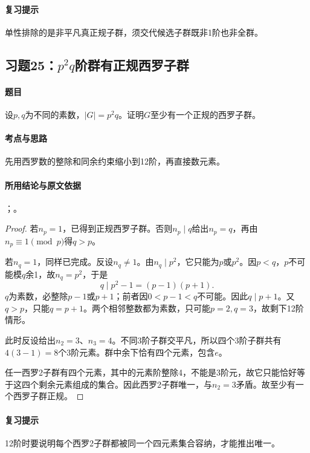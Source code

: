 \paragraph{复习提示}
单性排除的是非平凡真正规子群，须交代候选子群既非1阶也非全群。


\subsection{习题25：\texorpdfstring{$p^2q$阶群有正规西罗子群}{p2q阶群有正规西罗子群}}
\label{ex:2:25}

\paragraph{题目}
设$p,q$为不同的素数，$|G|=p^2q$。证明$G$至少有一个正规的西罗子群。

\paragraph{考点与思路}
先用西罗数的整除和同余约束缩小到12阶，再直接数元素。

\paragraph{所用结论与原文依据}
；。


\begin{proof}
若$n_p=1$，已得到正规西罗子群。否则$n_p\mid q$给出$n_p=q$，再由$n_p\equiv1\pmod p$得$q>p$。

若$n_q=1$，同样已完成。反设$n_q\ne1$。由$n_q\mid p^2$，它只能为$p$或$p^2$。因$p<q$，$p$不可能模$q$余1，故$n_q=p^2$，于是
\[
q\mid p^2-1=(p-1)(p+1).
\]
$q$为素数，必整除$p-1$或$p+1$；前者因$0<p-1<q$不可能。因此$q\mid p+1$。又$q>p$，只能$q=p+1$。两个相邻整数都为素数，只可能$p=2,q=3$，故剩下12阶情形。

此时反设给出$n_2=3$、$n_3=4$。不同3阶子群交平凡，所以四个3阶子群共有$4(3-1)=8$个3阶元素。群中余下恰有四个元素，包含$e$。

任一西罗2子群有四个元素，其中的元素阶整除4，不能是3阶元，故它只能恰好等于这四个剩余元素组成的集合。因此西罗2子群唯一，与$n_2=3$矛盾。故至少有一个西罗子群正规。
\end{proof}

\paragraph{复习提示}
12阶时要说明每个西罗2子群都被同一个四元素集合容纳，才能推出唯一。


